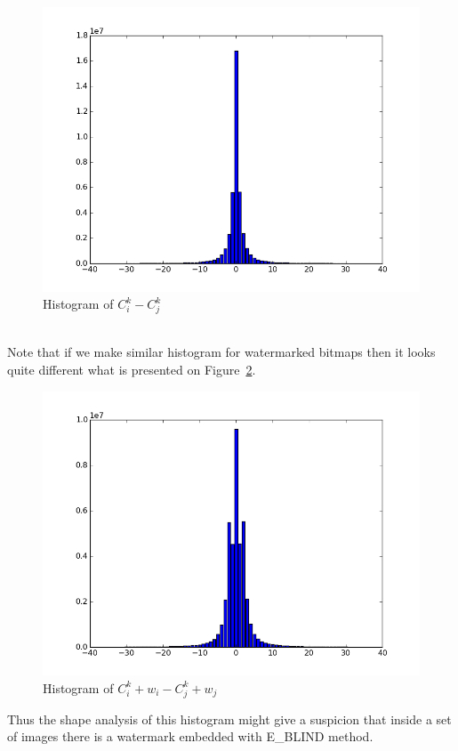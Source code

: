 \documentclass[a4paper,12pt]{article}
\begin{document}
\begin{figure}[ht]
  \centering
    \includegraphics[width=1.0\textwidth]{../../images/histograms/diff_hist_no_water_4pics.png}
  \caption{Histogram of $C^k_i - C^k_j$}
  \label{fig:delta-histogram}
\end{figure}\\
Note that if we make similar histogram for watermarked bitmaps
then it looks quite different what is presented on Figure~\ref{fig:delta-histogram-watermarked}.
\begin{figure}[ht!]
  \centering
    \includegraphics[width=1.0\textwidth]{../../images/histograms/diff_hist_water_4pics.png}
  \caption{Histogram of $C^k_i + w_i - C^k_j + w_j$}
  \label{fig:delta-histogram-watermarked}
\end{figure}
Thus the shape analysis of this histogram might give a suspicion that inside
a set of images there is a watermark embedded with E\_BLIND method.
\end{document}
